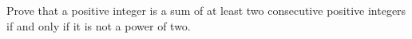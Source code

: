 Prove that a positive integer is a sum of at least two consecutive positive integers if and only if it is not a power of two.